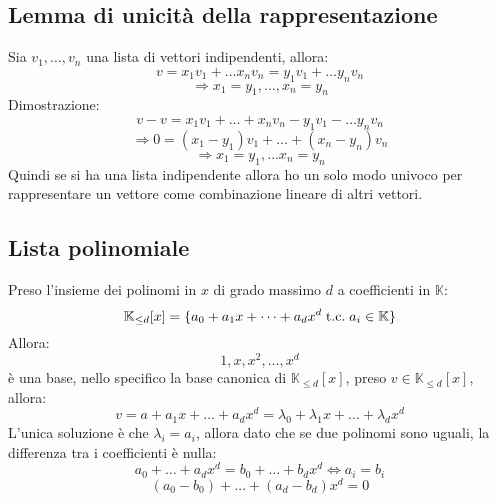 \documentclass[a4paper,12pt]{article}
\begin{document}
	\subsection{Lemma di unicità della rappresentazione}
	Sia $v_1, \dots, v_n$ una lista di vettori indipendenti, allora:
	\[v = x_1 v_1 + \dots x_n v_n = y_1 v_1 + \dots y_n v_n\]
	\[\Rightarrow x_1 = y_1, \dots, x_n = y_n\]
	Dimostrazione:
	\[v - v = x_1 v_1 + \dots + x_n v_n - y_1 v_1 - \dots y_n v_n\]
	\[\Rightarrow 0 = (x_1 - y_1) v_1 + \dots + (x_n - y_n) v_n\]
	\[\Rightarrow x_1 = y_1, \dots x_n = y_n\]
	Quindi se si ha una lista indipendente allora ho un solo modo univoco per rappresentare un vettore come combinazione lineare di altri vettori.
	
	\subsection{Lista polinomiale}
	Preso l'insieme dei polinomi in $x$ di grado massimo $d$ a coefficienti in $\mathbb{K}$:
	\[\mathbb{K}_{\leq d} [x] = \{a_0 + a_1 x + \dots + a_d x^d \;\text{t.c.}\; a_i \in \mathbb{K}\}\]
	Allora:
	\[1, x, x^2, \dots, x^d\]
	è una base, nello specifico la base canonica di $\mathbb{K}_{\leq d} [x]$, preso $v \in \mathbb{K}_{\leq d} [x]$, allora:
	\[v = a + a_1 x + \dots + a_d x^d = \lambda_0 + \lambda_1 x + \dots + \lambda_d x^d\]
	L'unica soluzione è che $\lambda_i = a_i$, allora dato che se due polinomi sono uguali, la differenza tra i coefficienti è nulla:
	\[a_0 + \dots + a_d x^d = b_0 + \dots + b_d x^d \iff a_i = b_i\]
	\[(a_0 - b_0) + \dots + (a_d - b_d)x^d = 0\]
	
\end{document}
